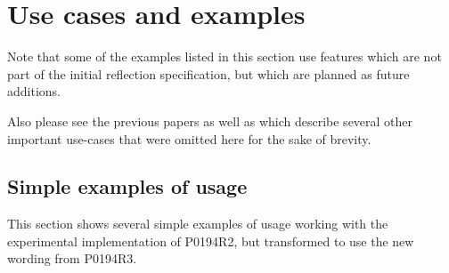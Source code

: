 \section{Use cases and examples}
\label{use-cases-examples}

Note that some of the examples listed in this section use features which
are not part of the initial reflection specification, but which are planned
as future additions.

Also please see the previous papers \cite{Chochlik-N4452,Chochlik-P0385R1}
as well as \cite{Chochlik-CAI} which describe several other important use-cases
that were omitted here for the sake of brevity.







%

\subsection{Simple examples of usage}
\label{working-examples}

This section shows several simple examples of usage working with the experimental
implementation of P0194R2, but transformed to use the new wording from P0194R3.









